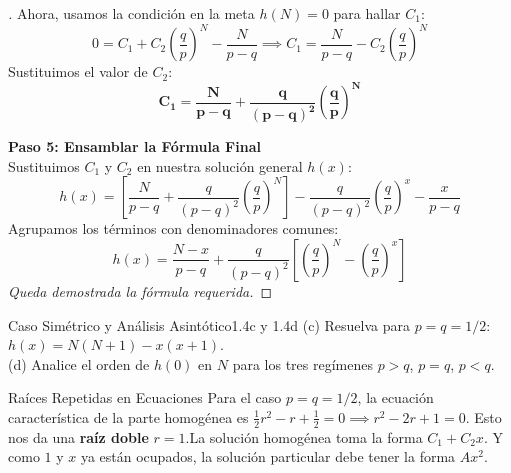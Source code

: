 \documentclass[10pt,a4paper]{article}
\begin{document}
\begin{proof}[]
    Ahora, usamos la condición en la meta $h(N) = 0$ para hallar $C_1$:
    \[ 0 = C_1 + C_2\left(\frac{q}{p}\right)^N - \frac{N}{p-q} \implies C_1 = \frac{N}{p-q} - C_2\left(\frac{q}{p}\right)^N \]
    Sustituimos el valor de $C_2$:
    \[ \mathbf{C_1 = \frac{N}{p-q} + \frac{q}{(p-q)^2}\left(\frac{q}{p}\right)^N} \]

    \vspace{5mm}

    \textbf{Paso 5: Ensamblar la Fórmula Final} \\
    Sustituimos $C_1$ y $C_2$ en nuestra solución general $h(x)$:
    \[ h(x) = \left[ \frac{N}{p-q} + \frac{q}{(p-q)^2}\left(\frac{q}{p}\right)^N \right] - \frac{q}{(p-q)^2}\left(\frac{q}{p}\right)^x - \frac{x}{p-q} \]
    Agrupamos los términos con denominadores comunes:
    \[ h(x) = \frac{N-x}{p-q} + \frac{q}{(p-q)^2}\left[ \left(\frac{q}{p}\right)^N - \left(\frac{q}{p}\right)^x \right] \]
    \textit{Queda demostrada la fórmula requerida.}
\end{proof}

\newpage

\begin{ejercicio}{Caso Simétrico y Análisis Asintótico}{1.4c y 1.4d}
    (c) Resuelva para $p = q = 1/2$: $h(x) = N(N+1) - x(x+1)$. \\
    (d) Analice el orden de $h(0)$ en $N$ para los tres regímenes $p > q$, $p = q$, $p < q$.
\end{ejercicio}

\vspace{2mm}

\begin{nota}{Raíces Repetidas en Ecuaciones }
    Para el caso $p=q=1/2$, la ecuación característica de la parte homogénea es 
    $\frac{1}{2}r^2 - r + \frac{1}{2} = 0 \implies r^2 - 2r + 1 = 0$. Esto nos da una \textbf{raíz doble} $r=1$.La solución homogénea toma la forma 
    $C_1 + C_2 x$. Y como $1$ y $x$ ya están ocupados, la solución particular debe tener la forma $Ax^2$.
\end{nota}

\vspace{2mm}
\end{document}
